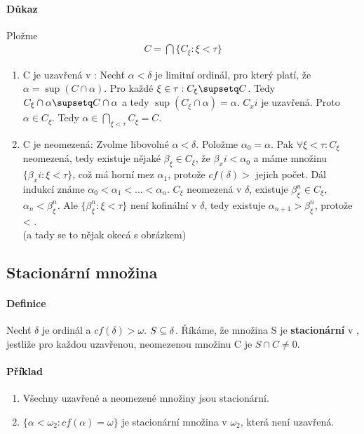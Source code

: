 \documentclass[a4paper,12pt,titlepage]{article}
\begin{document}
\begin{enumerate}
\paragraph{Důkaz}
Pložme 
\begin{align}
	C = \bigcap \{C_\xi: \xi < \tau \}
\end{align}
\begin{enumerate}
	\item C je uzavřená v \delta: Nechť $\alpha < \delta$ je limitní ordinál, pro
	který platí, že $\alpha = \sup(C \cap \alpha)$. Pro každé $\xi \in \tau:
	C_\xi \supsetq C$. Tedy $C_\xi \cap \alpha \supsetq C \cap \alpha$ a tedy
	$\sup(C_\xi \cap \alpha) = \alpha$. $C_xi$ je uzavřená. Proto $\alpha \in
	C_\xi$.
	Tedy $\alpha \in \bigcap_{\xi < \tau} C_\xi = C$.
	\item C je neomezená: Zvolme libovolné $\alpha < \delta$. Položme $\alpha_0
	= \alpha$. Pak
	$\forall \xi < \tau: C_\xi$ neomezená, tedy existuje nějaké $\beta_\xi \in
	C_\xi$, že $\beta_xi < \alpha_0$ a máme množinu $\{ \beta_xi : \xi < \tau
	\}$,
	což má horní mez $\alpha_1$, protože $cf(\delta) >$ jejich počet. Dál indukcí
	známe $\alpha_0 < \alpha_1 < ... < \alpha_n$. $C_\xi$ neomezená v $\delta$,
	existuje $\beta_\xi^n \in C_\xi$, $\alpha_n < \beta_\xi^n$. Ale $\{ \beta_\xi^n :
	\xi < \tau \}$ není kofinální v $\delta$, tedy existuje $\alpha_{n+1} >
	\beta_\xi^n$, protože \xi < \tau. \\
	(a tady se to nějak okecá s obrázkem)
\end{enumerate}

\subsection{Stacionární množina}
\setcounter{equation}{0}
\paragraph{Definice}
Nechť $\delta$ je ordinál a $cf(\delta) > \omega$. $S \subseteq \delta$. Říkáme, že
množina S je \textbf{stacionární} v \delta, jestliže pro každou uzavřenou,
neomezenou množinu C je $S \cap C \neq 0$.
\paragraph{Příklad}
\begin{enumerate}
	\item Všechny uzavřené a neomezené množiny jsou stacionární.
	\item $\{\alpha < \omega_2: cf(\alpha) = \omega\}$ je stacionární množina v
	$\omega_2$,	která není uzavřená.
\end{enumerate}


\end{enumerate}
\end{document}
